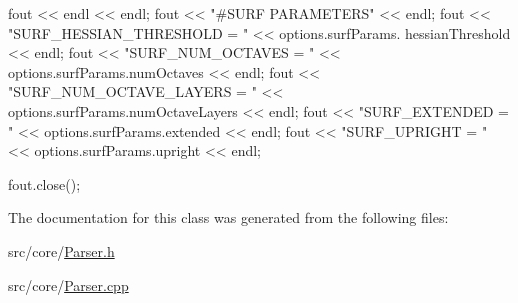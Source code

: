 \begin{DoxyCode}
{    fout << endl << endl;
    fout << "#SURF PARAMETERS" << endl;
    fout << "SURF_HESSIAN_THRESHOLD    = " << options.surfParams.
      hessianThreshold << endl;
    fout << "SURF_NUM_OCTAVES          = " << options.surfParams.numOctaves << 
      endl;
    fout << "SURF_NUM_OCTAVE_LAYERS    = " << options.surfParams.numOctaveLayers
       << endl;
    fout << "SURF_EXTENDED             = " << options.surfParams.extended << 
      endl;
    fout << "SURF_UPRIGHT              = " << options.surfParams.upright << 
      endl;


    fout.close();

}
\end{DoxyCode}


\-The documentation for this class was generated from the following files\-:\begin{DoxyCompactItemize}
\item 
src/core/\hyperlink{_parser_8h}{\-Parser.\-h}\item 
src/core/\hyperlink{_parser_8cpp}{\-Parser.\-cpp}\end{DoxyCompactItemize}
